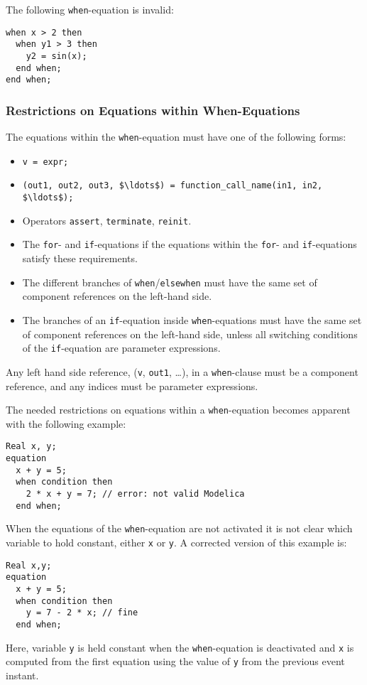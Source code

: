 \begin{example}
The following \lstinline!when!-equation is invalid:
\begin{lstlisting}[language=modelica]
when x > 2 then
  when y1 > 3 then
    y2 = sin(x);
  end when;
end when;
\end{lstlisting}
\end{example}

\subsubsection{Restrictions on Equations within When-Equations}\label{restrictions-on-equations-within-when-equations}

The equations within the \lstinline!when!-equation must have one of the following forms:
\begin{itemize}
\item
  \lstinline!v = expr;!
\item
  \lstinline!(out1, out2, out3, $\ldots$) = function_call_name(in1, in2, $\ldots$);!
\item
  Operators \lstinline!assert!, \lstinline!terminate!, \lstinline!reinit!.
\item
  The \lstinline!for!- and \lstinline!if!-equations if the equations within the \lstinline!for!- and \lstinline!if!-equations satisfy these requirements.
\item
  The different branches of \lstinline!when!/\lstinline!elsewhen! must have the same set of component references on the left-hand side.
\item
  The branches of an \lstinline!if!-equation inside \lstinline!when!-equations must have the same set of component references on the left-hand side, unless all switching conditions of the \lstinline!if!-equation are parameter expressions.
\end{itemize}

Any left hand side reference, (\lstinline!v!, \lstinline!out1!, \ldots), in a \lstinline!when!-clause must
be a component reference, and any indices must be parameter expressions.

\begin{nonnormative}
The needed restrictions on equations within a \lstinline!when!-equation becomes apparent with the following example:
\begin{lstlisting}[language=modelica]
  Real x, y;
equation
  x + y = 5;
  when condition then
    2 * x + y = 7; // error: not valid Modelica
  end when;
\end{lstlisting}

When the equations of the \lstinline!when!-equation are not activated it is not clear which variable to hold constant, either \lstinline!x! or \lstinline!y!.
A corrected version of this example is:
\begin{lstlisting}[language=modelica]
  Real x,y;
equation
  x + y = 5;
  when condition then
    y = 7 - 2 * x; // fine
  end when;
\end{lstlisting}
Here, variable \lstinline!y! is held constant when the \lstinline!when!-equation is deactivated and \lstinline!x! is computed from the first equation using the value of \lstinline!y! from the previous event instant.
\end{nonnormative}

